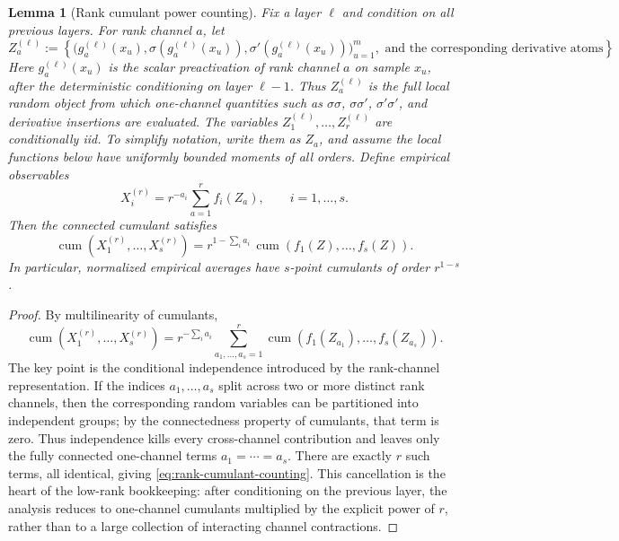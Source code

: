 \documentclass{article}
\newtheorem{lemma}[theorem]{Lemma}
\newcommand{\cumul}{\operatorname{cum}}
\begin{document}
\iffalse
\begin{lemma}[Rank cumulant power counting]
\label{lem:rank-cumulant-counting}
Fix a layer \(\ell\) and condition on all previous layers. For rank channel \(a\), let
\[
Z_a^{(\ell)}
:=
\left\{
\bigl(g_a^{(\ell)}(x_u),\sigma(g_a^{(\ell)}(x_u)),\sigma'(g_a^{(\ell)}(x_u))\bigr)_{u=1}^{m},
\text{ and the corresponding derivative atoms}
\right\}.
\]
Here \(g_a^{(\ell)}(x_u)\) is the scalar preactivation of rank channel \(a\) on sample \(x_u\), after the deterministic conditioning on layer \(\ell-1\). Thus \(Z_a^{(\ell)}\) is the full local random object from which one-channel quantities such as \(\sigma\sigma\), \(\sigma\sigma'\), \(\sigma'\sigma'\), and derivative insertions are evaluated. The variables \(Z_1^{(\ell)},\ldots,Z_r^{(\ell)}\) are conditionally iid. To simplify notation, write them as \(Z_a\), and assume the local functions below have uniformly bounded moments of all orders. Define empirical observables
\[
X_i^{(r)}=r^{-a_i}\sum_{a=1}^{r} f_i(Z_a),
\qquad i=1,\ldots,s.
\]
Then the connected cumulant satisfies
\begin{equation}
\cumul\left(X_1^{(r)},\ldots,X_s^{(r)}\right)
=r^{1-\sum_i a_i}\,
\cumul\left(f_1(Z),\ldots,f_s(Z)\right).
\label{eq:rank-cumulant-counting}
\end{equation}
In particular, normalized empirical averages have \(s\)-point cumulants of order \(r^{1-s}\).
\end{lemma}

\begin{proof}
By multilinearity of cumulants,
\[
\cumul(X_1^{(r)},\ldots,X_s^{(r)})
=r^{-\sum_i a_i}
\sum_{a_1,\ldots,a_s=1}^{r}
\cumul(f_1(Z_{a_1}),\ldots,f_s(Z_{a_s})).
\]
The key point is the conditional independence introduced by the rank-channel representation. If the indices \(a_1,\ldots,a_s\) split across two or more distinct rank channels, then the corresponding random variables can be partitioned into independent groups; by the connectedness property of cumulants, that term is zero. Thus independence kills every cross-channel contribution and leaves only the fully connected one-channel terms \(a_1=\cdots=a_s\). There are exactly \(r\) such terms, all identical, giving \eqref{eq:rank-cumulant-counting}. This cancellation is the heart of the low-rank bookkeeping: after conditioning on the previous layer, the analysis reduces to one-channel cumulants multiplied by the explicit power of \(r\), rather than to a large collection of interacting channel contractions.
\end{proof}
\end{document}
